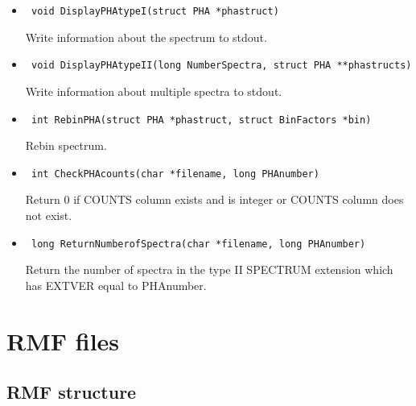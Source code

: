 \documentclass[11pt]{book}
\begin{document}
\begin{itemize}
\item      \begin{verbatim} void DisplayPHAtypeI(struct PHA *phastruct)\end{verbatim}

               Write information about the spectrum to stdout.

\item      \begin{verbatim} void DisplayPHAtypeII(long NumberSpectra, struct PHA **phastructs)\end{verbatim}

               Write information about multiple spectra to stdout.

\item      \begin{verbatim} int RebinPHA(struct PHA *phastruct, struct BinFactors *bin)\end{verbatim}

               Rebin spectrum.

\item      \begin{verbatim} int CheckPHAcounts(char *filename, long PHAnumber)\end{verbatim}

               Return 0 if COUNTS column exists and is integer 
               or COUNTS column does not exist.

\item      \begin{verbatim} long ReturnNumberofSpectra(char *filename, long PHAnumber)\end{verbatim}

               Return the number of spectra in the type II SPECTRUM
               extension which has EXTVER equal to PHAnumber.

\end{itemize}

\section{RMF files}

\subsection{RMF structure}
\end{document}

